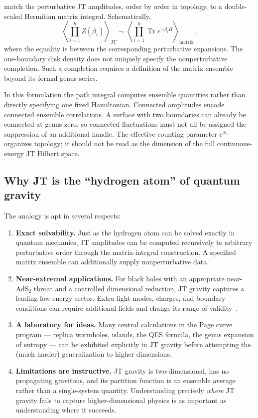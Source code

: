 \documentclass[11pt,letterpaper]{article}
\theoremstyle{plain}
\theoremstyle{definition}
\theoremstyle{remark}
\begin{document}
\citet{saadetal2019} match the perturbative JT amplitudes, order by order in
topology, to a double-scaled Hermitian matrix integral.  Schematically,
\begin{equation}
 \left\langle\prod_{i=1}^b Z(\beta_i)\right\rangle_{\mathrm{JT}}
 \sim\left\langle\prod_{i=1}^b\operatorname{Tr}e^{-\beta_iH}
 \right\rangle_{\mathrm{matrix}},
 \label{eq16:jt_matrix}
\end{equation}
where the equality is between the corresponding perturbative expansions.
The one-boundary disk density does not uniquely specify the nonperturbative
completion.  Such a completion requires a definition of the matrix ensemble
beyond its formal genus series.

In this formulation the path integral computes ensemble quantities rather
than directly specifying one fixed Hamiltonian.  Connected amplitudes encode
connected ensemble correlations.  A surface with two boundaries can already
be connected at genus zero, so connected fluctuations must not all be assigned
the suppression of an additional handle.  The effective counting parameter
$e^{S_0}$ organizes topology; it should not be read as the dimension of the
full continuous-energy JT Hilbert space.

\subsection{Why JT is the ``hydrogen atom'' of quantum gravity}

The analogy is apt in several respects:
\begin{enumerate}
  \item \textbf{Exact solvability.}  Just as the hydrogen atom can be solved
    exactly in quantum mechanics, JT amplitudes can be computed recursively to arbitrary perturbative order
    through the matrix-integral construction.  A specified matrix ensemble can
    additionally supply nonperturbative data.

  \item \textbf{Near-extremal applications.}  For black holes with an
    appropriate near-AdS$_2$ throat and a controlled dimensional reduction,
    JT gravity captures a leading low-energy sector.  Extra light modes,
    charges, and boundary conditions can require additional fields and change
    its range of validity~\cite{maldacena2016}.

  \item \textbf{A laboratory for ideas.}  Many central calculations in the
    Page curve program --- replica wormholes, islands, the QES formula, the
    genus expansion of entropy --- can be exhibited explicitly in JT gravity
    before attempting the (much harder) generalization to higher dimensions.

  \item \textbf{Limitations are instructive.}  JT gravity is two-dimensional,
    has no propagating gravitons, and its partition function is an ensemble
    average rather than a single-system quantity.  Understanding precisely
    \emph{where} JT gravity fails to capture higher-dimensional physics is as
    important as understanding where it succeeds.
\end{enumerate}
\end{document}

